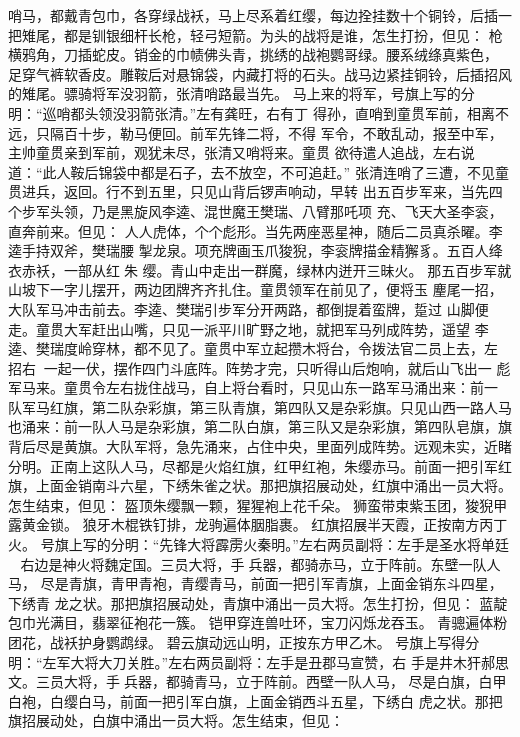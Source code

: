 哨马，都戴青包巾，各穿绿战袄，马上尽系着红缨，每边拴挂数十个铜铃，后插一
把雉尾，都是钏银细杆长枪，轻弓短箭。为头的战将是谁，怎生打扮，但见：
枪横鸦角，刀插蛇皮。销金的巾帻佛头青，挑绣的战袍鹦哥绿。腰系绒绦真紫色，
足穿气裤软香皮。雕鞍后对悬锦袋，内藏打将的石头。战马边紧挂铜铃，后插招风
的雉尾。骠骑将军没羽箭，张清哨路最当先。
马上来的将军，号旗上写的分明：“巡哨都头领没羽箭张清。”左有龚旺，右有丁
得孙，直哨到童贯军前，相离不远，只隔百十步，勒马便回。前军先锋二将，不得
军令，不敢乱动，报至中军，主帅童贯亲到军前，观犹未尽，张清又哨将来。童贯
欲待遣人追战，左右说道：“此人鞍后锦袋中都是石子，去不放空，不可追赶。”
张清连哨了三遭，不见童贯进兵，返回。行不到五里，只见山背后锣声响动，早转
出五百步军来，当先四个步军头领，乃是黑旋风李逵、混世魔王樊瑞、八臂那吒项
充、飞天大圣李衮，直奔前来。但见：
人人虎体，个个彪形。当先两座恶星神，随后二员真杀曜。李逵手持双斧，樊瑞腰
掣龙泉。项充牌画玉爪狻猊，李衮牌描金精獬豸。五百人绛衣赤袄，一部从红朱
缨。青山中走出一群魔，绿林内迸开三昧火。
那五百步军就山坡下一字儿摆开，两边团牌齐齐扎住。童贯领军在前见了，便将玉
麈尾一招，大队军马冲击前去。李逵、樊瑞引步军分开两路，都倒提着蛮牌，踅过
山脚便走。童贯大军赶出山嘴，只见一派平川旷野之地，就把军马列成阵势，遥望
李逵、樊瑞度岭穿林，都不见了。童贯中军立起攒木将台，令拨法官二员上去，左
招右，一起一伏，摆作四门斗底阵。阵势才完，只听得山后炮响，就后山飞出一
彪军马来。童贯令左右拢住战马，自上将台看时，只见山东一路军马涌出来：前一
队军马红旗，第二队杂彩旗，第三队青旗，第四队又是杂彩旗。只见山西一路人马
也涌来：前一队人马是杂彩旗，第二队白旗，第三队又是杂彩旗，第四队皂旗，旗
背后尽是黄旗。大队军将，急先涌来，占住中央，里面列成阵势。远观未实，近睹
分明。正南上这队人马，尽都是火焰红旗，红甲红袍，朱缨赤马。前面一把引军红
旗，上面金销南斗六星，下绣朱雀之状。那把旗招展动处，红旗中涌出一员大将。
怎生结束，但见：
盔顶朱缨飘一颗，猩猩袍上花千朵。
狮蛮带束紫玉团，狻猊甲露黄金锁。
狼牙木棍铁钉排，龙驹遍体胭脂裹。
红旗招展半天霞，正按南方丙丁火。
号旗上写的分明：“先锋大将霹雳火秦明。”左右两员副将：左手是圣水将单廷，
右边是神火将魏定国。三员大将，手兵器，都骑赤马，立于阵前。东壁一队人马，
尽是青旗，青甲青袍，青缨青马，前面一把引军青旗，上面金销东斗四星，下绣青
龙之状。那把旗招展动处，青旗中涌出一员大将。怎生打扮，但见：
蓝靛包巾光满目，翡翠征袍花一簇。
铠甲穿连兽吐环，宝刀闪烁龙吞玉。
青骢遍体粉团花，战袄护身鹦鹉绿。
碧云旗动远山明，正按东方甲乙木。
号旗上写得分明：“左军大将大刀关胜。”左右两员副将：左手是丑郡马宣赞，右
手是井木犴郝思文。三员大将，手兵器，都骑青马，立于阵前。西壁一队人马，
尽是白旗，白甲白袍，白缨白马，前面一把引军白旗，上面金销西斗五星，下绣白
虎之状。那把旗招展动处，白旗中涌出一员大将。怎生结束，但见：
